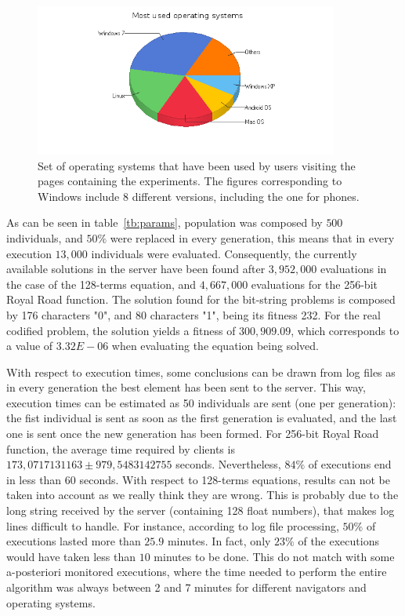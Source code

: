 \documentclass[runningheads,a4paper]{llncs}
\begin{document}
\begin{figure}
\centering
\includegraphics[height=5cm]{Most_Used_Operating_Systems}
\caption{Set of operating systems that have been used by users visiting the pages containing the experiments. The figures corresponding to Windows include 8 different versions, including the one for phones.
}
\label{fig:operating-systems}
\end{figure}

As can be seen in table~\ref{tb:params}, population was composed by $500$ individuals, and $50\%$ were replaced in every generation, this means that in every execution $13,000$ individuals were evaluated. Consequently, the currently available solutions in the server have been found after $3,952,000$ evaluations in the case of the 128-terms equation, and $4,667,000$ evaluations for the 256-bit Royal Road function. The solution found for the bit-string problems is composed by 176 characters "0", and 80 characters "1", being  its fitness 232. For the real codified problem, the solution yields a fitness of $300,909.09$, which corresponds to a value of $3.32E-06$ when evaluating the equation being solved.

With respect to execution times, some conclusions can be drawn from log files as in every generation the best element has been sent to the server. This way, execution times can be estimated as 50 individuals are sent (one per generation): the fist individual is sent as soon as the first generation is evaluated, and the last one is sent once the new generation has been formed. For 256-bit Royal Road function, the average time required by clients is $173,0717131163\pm979,5483142755$ seconds. Nevertheless, $84\%$ of executions end in less than $60$ seconds. With respect to 128-terms equations, results can not be taken into account as we really think they are wrong. This is probably due to the long string received by the server (containing 128 float numbers), that makes log lines difficult to handle. For instance, according to log file processing, $50\%$ of executions lasted more than $25.9$ minutes. In fact, only $23\%$ of the executions would have taken less than $10$ minutes to be done. This do not match with  some a-posteriori monitored executions, where the time needed to perform the entire algorithm was always between 2 and 7 minutes for different navigators and operating systems.
\end{document}
